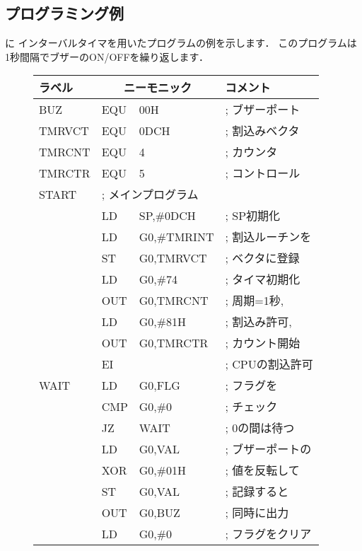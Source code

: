 \subsection{プログラミング例}
に
インターバルタイマを用いたプログラムの例を示します．
このプログラムは1秒間隔でブザーのON/OFFを繰り返します．

\begin{figure}[btp]
{\small\tt\begin{center}
\begin{tabular}{|l|l l l|} \hline
ラベル & \multicolumn{2}{|c}{ニーモニック} & コメント      \\
\hline
BUZ   & EQU   & 00H               & ; ブザーポート   \\
TMRVCT& EQU   & 0DCH              & ; 割込みベクタ   \\
TMRCNT& EQU   & 4                 & ; カウンタ       \\
TMRCTR& EQU   & 5                 & ; コントロール   \\
START & \multicolumn{3}{|l|}{; メインプログラム}     \\
      & LD    & SP,\#0DCH         & ; SP初期化       \\
      & LD    & G0,\#TMRINT       & ; 割込ルーチンを \\
      & ST    & G0,TMRVCT         & ;   ベクタに登録 \\
      & LD    & G0,\#74           & ; タイマ初期化   \\
      & OUT   & G0,TMRCNT         & ;   周期=1秒,    \\
      & LD    & G0,\#81H          & ;   割込み許可,  \\
      & OUT   & G0,TMRCTR	  & ;   カウント開始 \\
      & EI    &                   & ; CPUの割込許可  \\
WAIT  & LD    & G0,FLG            & ; フラグを       \\
      & CMP   & G0,\#0            & ;   チェック     \\
      & JZ    & WAIT              & ; 0の間は待つ    \\
      & LD    & G0,VAL            & ; ブザーポートの \\
      & XOR   & G0,\#01H          & ;   値を反転して \\
      & ST    & G0,VAL            & ;   記録すると   \\
      & OUT   & G0,BUZ            & ;   同時に出力   \\
      & LD    & G0,\#0            & ; フラグをクリア \\

\end{tabular}
\end{center}}
\end{figure}
